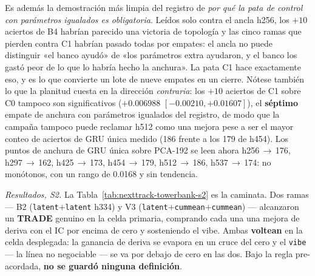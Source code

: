 \documentclass[11pt]{article}
\begin{document}
Es además la demostración más limpia del registro de \emph{por qué la pata de
control con parámetros igualados es obligatoria}. Leídos solo contra el ancla
h256, los $+\num{10}$ aciertos de B4 habrían parecido una victoria de topología y
las cinco ramas que pierden contra C1 habrían pasado todas por empates: el ancla
no puede distinguir «el banco ayudó» de «los parámetros extra ayudaron, y el banco
los gastó peor de lo que lo habría hecho la anchura». La pata C1 hace exactamente
eso, y es lo que convierte un lote de nueve empates en un cierre. Nótese también
lo que la planitud cuesta en la dirección \emph{contraria}: los $+\num{10}$
aciertos de C1 sobre C0 tampoco son significativos ($+\num{0.006988}$
$[-\num{0.00210},+\num{0.01607}]$), el \textbf{séptimo} empate de anchura con
parámetros igualados del registro, de modo que la campaña tampoco puede reclamar
h512 como una mejora pese a ser el mayor conteo de aciertos de GRU única medido
(\num{186} frente a los \num{179} de h454). Los puntos de anchura de GRU única
sobre PCA-192 se leen ahora h256\,$\to$\,\num{176}, h297\,$\to$\,\num{162},
h425\,$\to$\,\num{173}, h454\,$\to$\,\num{179}, h512\,$\to$\,\num{186},
h537\,$\to$\,\num{174}: no monótonos, con un rango de \num{0.0168} y sin
tendencia.

\emph{Resultados, S2.} La Tabla~\ref{tab:nexttrack-towerbank-s2} es la caminata. Dos ramas
--- B2 (\texttt{latent}$+$\texttt{latent} h334) y V3
(\texttt{latent}$+$\texttt{cummean}$+$\texttt{cummean}) --- alcanzaron un
\textbf{TRADE} genuino en la celda primaria, comprando cada una una mejora de
deriva con el IC por encima de cero y sosteniendo el vibe. Ambas
\textbf{voltean} en la celda desplegada: la ganancia de deriva se evapora en un
cruce del cero y el \texttt{vibe} --- la línea no negociable --- se va por debajo
de cero en las dos. Bajo la regla pre-acordada, \textbf{no se guardó ninguna
definición}.
\end{document}
